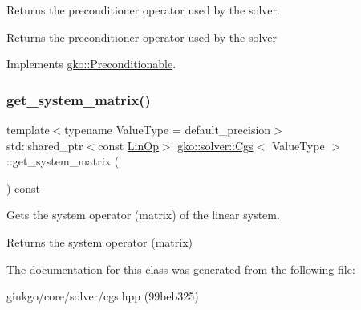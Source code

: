 Returns the preconditioner operator used by the solver. 

\begin{DoxyReturn}{Returns}
the preconditioner operator used by the solver 
\end{DoxyReturn}


Implements \hyperlink{classgko_1_1Preconditionable_ad9545089aef0dfc83bc7a74e5bf1d748}{gko\+::\+Preconditionable}.

\mbox{\label{classgko_1_1solver_1_1Cgs_aa537b2e6b7ccf95e96b4100866da1770}} 
\subsubsection{\texorpdfstring{get\+\_\+system\+\_\+matrix()}{get\_system\_matrix()}}
{\footnotesize\ttfamily template$<$typename Value\+Type  = default\+\_\+precision$>$ \\
std\+::shared\+\_\+ptr$<$const \hyperlink{classgko_1_1LinOp}{Lin\+Op}$>$ \hyperlink{classgko_1_1solver_1_1Cgs}{gko\+::solver\+::\+Cgs}$<$ Value\+Type $>$\+::get\+\_\+system\+\_\+matrix (\begin{DoxyParamCaption}{ }\end{DoxyParamCaption}) const}



Gets the system operator (matrix) of the linear system. 

\begin{DoxyReturn}{Returns}
the system operator (matrix) 
\end{DoxyReturn}


The documentation for this class was generated from the following file\+:\begin{DoxyCompactItemize}
\item 
ginkgo/core/solver/cgs.\+hpp (99beb325)\end{DoxyCompactItemize}
